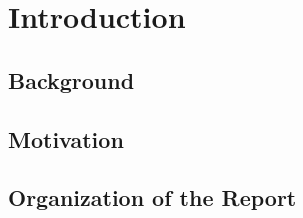 \chapter{Introduction}
\blindtext %

\section{Background}
\blindtext %

\section{Motivation}
\blindtext %

\section{Organization of the Report}
\blindtext %
